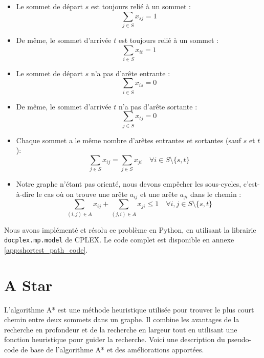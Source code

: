 \begin{itemize}
    \item Le sommet de départ $s$ est toujours relié à un sommet :
    \begin{equation}
        \sum_{j \in S} x_{sj} = 1
    \end{equation}
    \item De même, le sommet d'arrivée $t$ est toujours relié à un sommet :
    \begin{equation}
        \sum_{i \in S} x_{it} = 1
    \end{equation}
    \item Le sommet de départ $s$ n'a pas d'arête entrante :
    \begin{equation}
        \sum_{i \in S} x_{is} = 0
    \end{equation}
    \item De même, le sommet d'arrivée $t$ n'a pas d'arête sortante :
    \begin{equation}
        \sum_{j \in S} x_{tj} = 0
    \end{equation}
    \item Chaque sommet a le même nombre d'arêtes entrantes et sortantes (sauf $s$ et $t$):
    \begin{equation}
        \sum_{j \in S} x_{ij} = \sum_{j \in S} x_{ji} \quad \forall i \in S \setminus \{s,t\}
    \end{equation}
    \item Notre graphe n'étant pas orienté, nous devons empêcher les sous-cycles, c'est-à-dire le cas où on trouve une arête $a_{ij}$ et une arête $a_{ji}$ dans le chemin :
    \begin{equation}
        \sum_{(i,j) \in A} x_{ij} + \sum_{(j,i) \in A} x_{ji} \leq 1 \quad \forall i,j \in S \setminus \{s,t\}
    \end{equation}
\end{itemize}

Nous avons implémenté et résolu ce problème en Python, en utilisant la librairie \texttt{docplex.mp.model} de CPLEX. Le code complet est disponible en annexe \ref{app:shortest_path_code}.

\section{A Star}
\label{sec:shortest_path_astar}

L'algorithme A* est une méthode heuristique utilisée pour trouver le plus court chemin entre deux sommets dans un graphe. Il combine les avantages de la recherche en profondeur et de la recherche en largeur tout en utilisant une fonction heuristique pour guider la recherche. Voici une description du pseudo-code de base de l'algorithme A* et des améliorations apportées.

